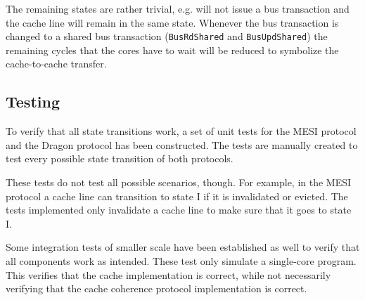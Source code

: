 



The remaining states are rather trivial, e.g. will not issue a bus transaction and the cache line will remain
in the same state. Whenever the bus transaction is changed to a shared bus transaction (\texttt{BusRdShared}
and \texttt{BusUpdShared}) the remaining cycles that the cores have to wait will be reduced to symbolize
the cache-to-cache transfer.

\subsection{Testing}
To verify that all state transitions work, a set of unit tests for the MESI protocol and the Dragon protocol has been constructed.
The tests are manually created to test every possible state transition of both protocols.

These tests do not test all possible scenarios, though.
For example, in the MESI protocol a cache line can transition to state I if it is invalidated or evicted.
The tests implemented only invalidate a cache line to make sure that it goes to state I.

Some integration tests of smaller scale have been established as well to verify that all components work as intended.
These test only simulate a single-core program. This verifies that the cache
implementation is correct, while not necessarily verifying that the cache coherence protocol
implementation is correct.

